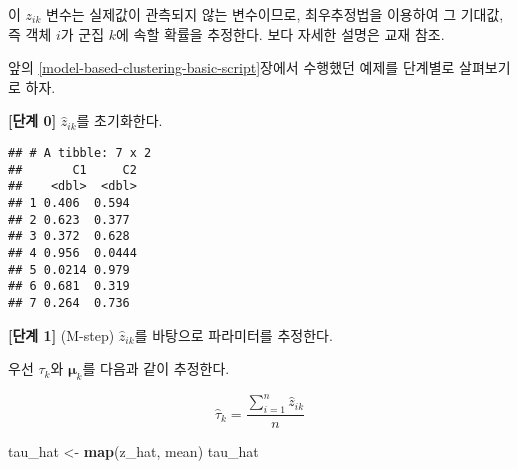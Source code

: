 \documentclass[]{book}
\newenvironment{Shaded}{\begin{snugshade}}{\end{snugshade}}
\newcommand{\CommentTok}[1]{\textcolor[rgb]{0.56,0.35,0.01}{\textit{#1}}}
\newcommand{\DataTypeTok}[1]{\textcolor[rgb]{0.13,0.29,0.53}{#1}}
\newcommand{\DecValTok}[1]{\textcolor[rgb]{0.00,0.00,0.81}{#1}}
\newcommand{\KeywordTok}[1]{\textcolor[rgb]{0.13,0.29,0.53}{\textbf{#1}}}
\newcommand{\NormalTok}[1]{#1}
\newcommand{\OperatorTok}[1]{\textcolor[rgb]{0.81,0.36,0.00}{\textbf{#1}}}
\newcommand{\StringTok}[1]{\textcolor[rgb]{0.31,0.60,0.02}{#1}}
\begin{document}
이 \(z_{ik}\) 변수는 실제값이 관측되지 않는 변수이므로, 최우추정법을 이용하여 그 기대값, 즉 객체 \(i\)가 군집 \(k\)에 속할 확률을 추정한다. 보다 자세한 설명은 교재 \citep{jun2012datamining} 참조.

앞의 \ref{model-based-clustering-basic-script}장에서 수행했던 예제를 단계별로 살펴보기로 하자.

\textbf{{[}단계 0{]}} \(\hat{z}_{ik}\)를 초기화한다.

\begin{Shaded}
\end{Shaded}

\begin{verbatim}
## # A tibble: 7 x 2
##       C1     C2
##    <dbl>  <dbl>
## 1 0.406  0.594 
## 2 0.623  0.377 
## 3 0.372  0.628 
## 4 0.956  0.0444
## 5 0.0214 0.979 
## 6 0.681  0.319 
## 7 0.264  0.736
\end{verbatim}

\textbf{{[}단계 1{]}} (M-step) \(\hat{z}_{ik}\)를 바탕으로 파라미터를 추정한다.

우선 \(\tau_k\)와 \(\boldsymbol\mu_k\)를 다음과 같이 추정한다.

\begin{equation*}
\hat{\tau}_k = \frac{\sum_{i = 1}^{n} \hat{z}_{ik}}{n}
\end{equation*}

\begin{Shaded}
\begin{Highlighting}[]
\NormalTok{tau_hat <-}\StringTok{ }\KeywordTok{map}\NormalTok{(z_hat, mean)}
\NormalTok{tau_hat}
\end{Highlighting}
\end{Shaded}
\end{document}
